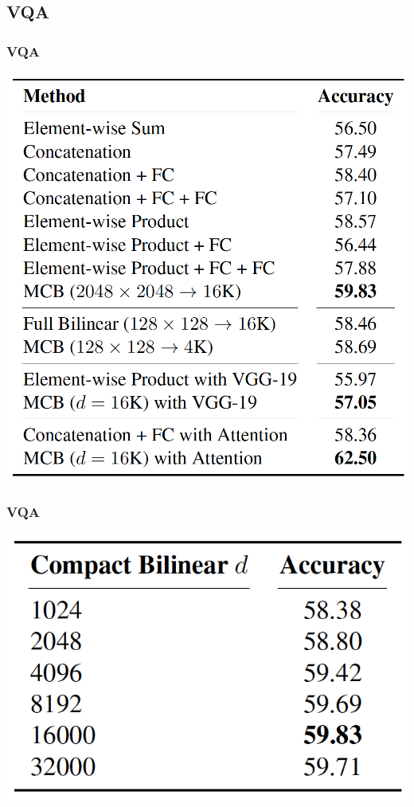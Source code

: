 \documentclass{beamer}
\begin{document}
\subsection{VQA}
\begin{frame}
\frametitle{VQA}
\begin{center}
\includegraphics[scale=0.4]{./images/VQA_Result01}
\end{center}
\end{frame}
\begin{frame}
\frametitle{VQA}
\begin{center}
\includegraphics[scale=0.5]{./images/VQA_Result02}
\end{center}
\end{frame}
\end{document}
